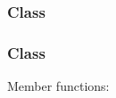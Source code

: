 \subsubsection[Class ArrayHandle]{Class }

\subsubsection[Class FunctionHandle]{Class }

Member functions:

